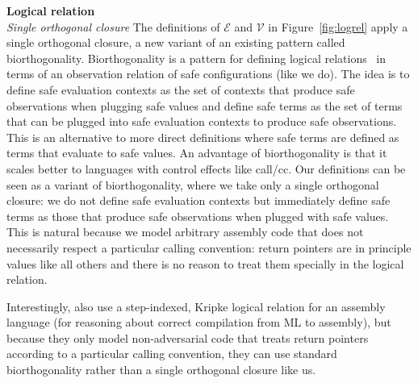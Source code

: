 \documentclass{llncs}
\newcommand{\asmType}{\plaindom{AsmType}}
\newcommand{\plaindom}[1]{\mathrm{#1}}
\newcommand{\intr}[2]{\mathcal{#1}}
\newcommand{\valueintr}[1]{\intr{V}{#1}}
\newcommand{\exprintr}[1]{\intr{E}{#1}}
\newcommand{\stdvr}{\valueintr{\asmType}}
\newcommand{\stder}{\exprintr{\asmType}}
\begin{document}
\noindent\textbf{Logical relation}\\
\emph{Single orthogonal closure} The definitions of $\stder$ and $\stdvr$ in
Figure~\ref{fig:logrel} apply a single orthogonal closure, a new variant of an
existing pattern called biorthogonality. Biorthogonality is a pattern for
defining logical relations~\cite{krivine_classical_1994,pitts_operational_1998}
in terms of an observation relation of safe configurations (like we do). The
idea is to define safe evaluation contexts as the set of contexts that produce
safe observations when plugging safe values and define safe terms as the set of
terms that can be plugged into safe evaluation contexts to produce safe
observations. This is an alternative to more direct definitions where safe terms
are defined as terms that evaluate to safe values. An advantage of
biorthogonality is that it scales better to languages with control effects like
call/cc. Our definitions can be seen as a variant of biorthogonality, where we
take only a single orthogonal closure: we do not define safe evaluation contexts
but immediately define safe terms as those that produce safe observations when
plugged with safe values. This is natural because we model arbitrary assembly
code that does not necessarily respect a particular calling convention: return
pointers are in principle values like all others and there is no reason to treat
them specially in the logical relation.

Interestingly, \cite{Hur:2011:KLR:1926385.1926402} also use a step-indexed,
Kripke logical relation for an assembly language (for reasoning about correct
compilation from ML to assembly), but because they only model non-adversarial
code that treats return pointers according to a particular calling convention,
they can use standard biorthogonality rather than a single orthogonal closure
like us.
\end{document}
